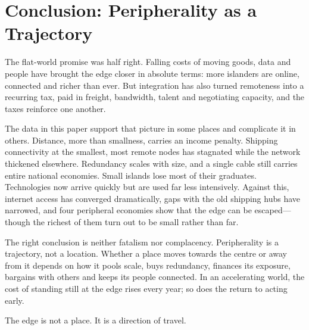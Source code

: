 \section{Conclusion: Peripherality as a Trajectory}
\label{sec:conclusion}

The flat-world promise was half right. Falling costs of moving goods, data
and people have brought the edge closer in absolute terms: more islanders are
online, connected and richer than ever. But integration has also turned
remoteness into a recurring tax, paid in freight, bandwidth, talent and
negotiating capacity, and the taxes reinforce one another.

The data in this paper support that picture in some places and complicate it
in others. Distance, more than smallness, carries an income penalty. Shipping
connectivity at the smallest, most remote nodes has stagnated while the
network thickened elsewhere. Redundancy scales with size, and a single cable
still carries entire national economies. Small islands lose most of their
graduates. Technologies now arrive quickly but are used far less intensively.
Against this, internet access has converged dramatically, gaps with the old
shipping hubs have narrowed, and four peripheral economies show that the edge
can be escaped---though the richest of them turn out to be small rather than
far.

The right conclusion is neither fatalism nor complacency. Peripherality is a
trajectory, not a location. Whether a place moves towards the centre or away
from it depends on how it pools scale, buys redundancy, finances its
exposure, bargains with others and keeps its people connected. In an
accelerating world, the cost of standing still at the edge rises every year;
so does the return to acting early.

\begin{pullquote}
The edge is not a place. It is a direction of travel.
\end{pullquote}
